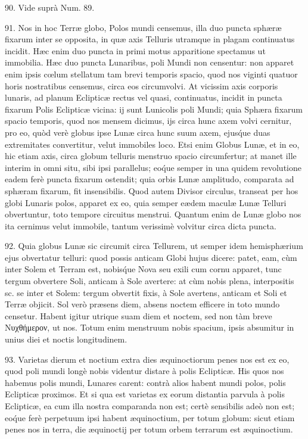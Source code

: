 \documentclass[a4paper, 11pt, oneside, polutonikogreek, german]{article}
\begin{document}
90. Vide suprà Num. 89.

91. Nos in hoc Terræ globo, Polos mundi censemus, illa duo puncta sphæræ fixarum inter se opposita, in quæ axis Telluris utramque in plagam continuatus incidit. Hæc enim duo puncta in primi motus apparitione spectamus ut immobilia. Hæc duo puncta Lunaribus, poli Mundi non censentur: non apparet enim ipsis cœlum stellatum tam brevi temporis spacio, quod nos viginti quatuor horis nostratibus censemus, circa eos circumvolvi. At vicissim axis corporis lunaris, ad planum Eclipticæ rectus vel quasi, continuatus, incidit in puncta fixarum Polis Eclipticæ vicina: ij sunt Lunicolis poli Mundi; quia Sphæra fixarum spacio temporis, quod nos mensem dicimus, ijs circa hunc axem volvi cernitur, pro eo, quòd verè globus ipse Lunæ circa hunc suum axem, ejus\'que duas extremitates convertitur, velut immobiles loco. Etsi enim Globus Lunæ, et in eo, hic etiam axis, circa globum telluris menstruo spacio circumfertur; at manet ille interim in omni situ, sibi ipsi parallelus; eo\'que semper in una quidem revolutione eadem ferè puncta fixarum ostendit; quia orbis Lunæ amplitudo, comparata ad sphæram fixarum, fit insensibilis. Quod autem Divisor circulus, transeat per hos globi Lunaris polos, apparet ex eo, quia semper eædem maculæ Lunæ Telluri obvertuntur, toto tempore circuitus menstrui. Quantum enim de Lunæ globo nos ita cernimus velut immobile, tantum verissimè volvitur circa dicta puncta.

92. Quia globus Lunæ sic circumit circa Tellurem, ut semper idem hemisphærium ejus obvertatur telluri: quod possis anticam Globi hujus dicere: patet, eam, cùm inter Solem et Terram est, nobis\'que Nova seu exili cum cornu apparet, tunc tergum obvertere Soli, anticam à Sole avertere: at cùm nobis plena, interpositis sc. se inter et Solem: tergum obvertit fixis, à Sole avertens, anticam et Soli et Terræ objicit. Sol verò præsens diem, absens noctem efficere in toto mundo censetur. Habent igitur utrique suam diem et noctem, sed non tàm breve Νυχθήμερον, ut nos. Totum enim menstruum nobis spacium, ipsis absumitur in unius diei et noctis longitudinem.

93. Varietas dierum et noctium extra dies æquinoctiorum penes nos est ex eo, quod poli mundi longè nobis videntur distare à polis Eclipticæ. His quos nos habemus polis mundi, Lunares carent: contrà alios habent mundi polos, polis Eclipticæ proximos. Et si qua est varietas ex eorum distantia parvula à polis Eclipticæ, ea cum illa nostra comparanda non est; certè sensibilis adeò non est; eo\'que ferè perpetuum ipsi habent æquinoctium, per totum globum: sicut etiam penes nos in terra, die æquinoctij per totum orbem terrarum est æquinoctium.
\end{document}
